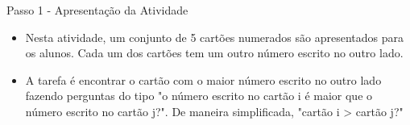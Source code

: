 \documentclass{beamer}
\begin{document}
\begin{frame}{Passo 1 - Apresentação da Atividade}

\begin{itemize}
   
\item <1->Nesta atividade, um conjunto de 5 cartões numerados são apresentados para os alunos. Cada um dos cartões tem um outro número escrito no outro lado. 

\begin{center}
\end{center}


\item <2->A tarefa é encontrar o cartão com o maior número escrito no outro lado fazendo perguntas do tipo "o número escrito no cartão i é maior que o número escrito no cartão j?". De maneira simplificada, "cartão i > cartão j?"



\end{itemize}

\end{frame}
\end{document}
